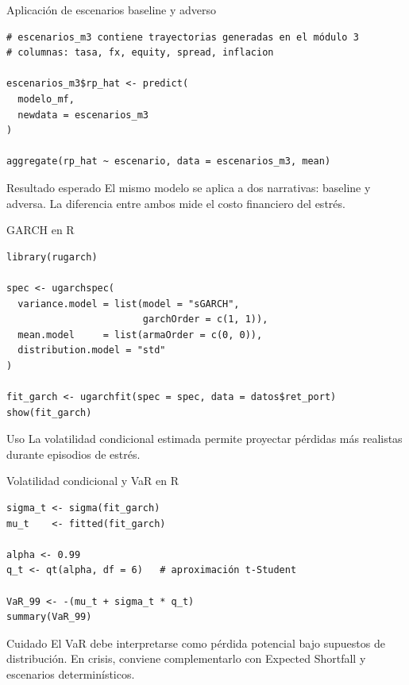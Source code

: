 \documentclass[aspectratio=169,11pt]{beamer}
\begin{document}
\begin{frame}[fragile]{Aplicación de escenarios baseline y adverso}
\begin{lstlisting}[style=Rstyle]
# escenarios_m3 contiene trayectorias generadas en el módulo 3
# columnas: tasa, fx, equity, spread, inflacion

escenarios_m3$rp_hat <- predict(
  modelo_mf,
  newdata = escenarios_m3
)

aggregate(rp_hat ~ escenario, data = escenarios_m3, mean)
\end{lstlisting}

\begin{alertblock}{Resultado esperado}
El mismo modelo se aplica a dos narrativas: baseline y adversa. La diferencia entre ambos mide el costo financiero del estrés.
\end{alertblock}
\end{frame}

\begin{frame}[fragile]{GARCH en R}
\begin{lstlisting}[style=Rstyle]
library(rugarch)

spec <- ugarchspec(
  variance.model = list(model = "sGARCH",
                        garchOrder = c(1, 1)),
  mean.model     = list(armaOrder = c(0, 0)),
  distribution.model = "std"
)

fit_garch <- ugarchfit(spec = spec, data = datos$ret_port)
show(fit_garch)
\end{lstlisting}

\begin{block}{Uso}
La volatilidad condicional estimada permite proyectar pérdidas más realistas durante episodios de estrés.
\end{block}
\end{frame}

\begin{frame}[fragile]{Volatilidad condicional y VaR en R}
\begin{lstlisting}[style=Rstyle]
sigma_t <- sigma(fit_garch)
mu_t    <- fitted(fit_garch)

alpha <- 0.99
q_t <- qt(alpha, df = 6)   # aproximación t-Student

VaR_99 <- -(mu_t + sigma_t * q_t)
summary(VaR_99)
\end{lstlisting}

\begin{alertblock}{Cuidado}
El VaR debe interpretarse como pérdida potencial bajo supuestos de distribución. En crisis, conviene complementarlo con Expected Shortfall y escenarios determinísticos.
\end{alertblock}
\end{frame}
\end{document}
